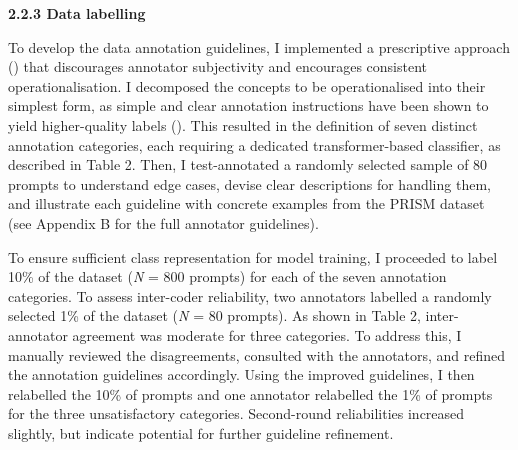 \documentclass[
  12pt,
]{article}
\begin{document}
\textbf{2.2.3 Data labelling}

To develop the data annotation guidelines, I implemented a prescriptive approach () that discourages annotator subjectivity and encourages consistent operationalisation. I decomposed the concepts to be operationalised into their simplest form, as simple and clear annotation instructions have been shown to yield higher-quality labels (). This resulted in the definition of seven distinct annotation categories, each requiring a dedicated transformer-based classifier, as described in Table 2. Then, I test-annotated a randomly selected sample of 80 prompts to understand edge cases, devise clear descriptions for handling them, and illustrate each guideline with concrete examples from the PRISM dataset (see Appendix B for the full annotator guidelines).

To ensure sufficient class representation for model training, I proceeded to label 10\% of the dataset (\emph{N} = 800 prompts) for each of the seven annotation categories. To assess inter-coder reliability, two annotators labelled a randomly selected 1\% of the dataset (\emph{N} = 80 prompts). As shown in Table 2, inter-annotator agreement was moderate for three categories. To address this, I manually reviewed the disagreements, consulted with the annotators, and refined the annotation guidelines accordingly. Using the improved guidelines, I then relabelled the 10\% of prompts and one annotator relabelled the 1\% of prompts for the three unsatisfactory categories. Second-round reliabilities increased slightly, but indicate potential for further guideline refinement.
\end{document}
